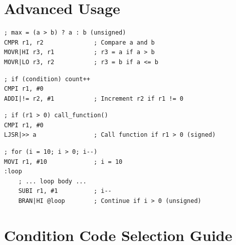 \section{Advanced Usage}

\begin{example}
	\begin{lstlisting}
; max = (a > b) ? a : b (unsigned)
CMPR r1, r2              ; Compare a and b
MOVR|HI r3, r1           ; r3 = a if a > b
MOVR|LO r3, r2           ; r3 = b if a <= b
	\end{lstlisting}
	\caption{Conditional Assignment}
\end{example}

\begin{example}
	\begin{lstlisting}
; if (condition) count++
CMPI r1, #0
ADDI|!= r2, #1           ; Increment r2 if r1 != 0
	\end{lstlisting}
	\caption{Conditional Increment}
\end{example}

\begin{example}
	\begin{lstlisting}
; if (r1 > 0) call_function()
CMPI r1, #0
LJSR|>> a                ; Call function if r1 > 0 (signed)
	\end{lstlisting}
	\caption{Conditional Function Call}
\end{example}

\begin{example}
	\begin{lstlisting}
; for (i = 10; i > 0; i--)
MOVI r1, #10             ; i = 10
:loop
    ; ... loop body ...
    SUBI r1, #1          ; i--
    BRAN|HI @loop        ; Continue if i > 0 (unsigned)
	\end{lstlisting}
	\caption{Loop Construction}
\end{example}

\section{Condition Code Selection Guide}

